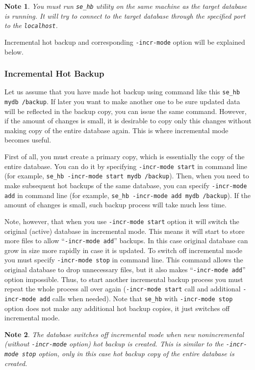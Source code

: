 \documentclass[a4paper,12pt]{article}
\newtheorem{note}{Note}    %
\begin{document}
\begin{note}
You must run \verb!se_hb! utility on the same machine as the target database is
running. It will try to connect to the target database through the specified
port to the \verb!localhost!.
\end{note}

Incremental hot backup and corresponding \verb!-incr-mode! option will be
explained below.


\subsubsection*{Incremental Hot Backup}

Let us assume that you have made hot backup using command like this
\verb!se_hb mydb /backup!. If later you want to make another one to be sure
updated data will be reflected in the backup copy, you can issue the same
command. However, if the amount of changes is small, it is desirable to copy
only this changes without making copy of the entire database again. This is
where incremental mode becomes useful.

First of all, you must create a primary copy, which is essentially the copy of
the entire database. You can do it by specifying \verb!-incr-mode start! in
command line (for example, \verb!se_hb -incr-mode start mydb /backup!). Then,
when you need to make subsequent hot backups of the same database, you can
specify \verb!-incr-mode add! in command line (for example,
\verb!se_hb -incr-mode add mydb /backup!). If the amount of changes is small,
such backup process will take much less time.

Note, however, that when you use \verb!-incr-mode start! option it will switch
the original (active) database in incremental mode. This means it will start to
store more files to allow ``\verb!-incr-mode add!'' backups. In this case
original database can grow in size more rapidly in case it is updated. To switch
off incremental mode you must specify \verb!-incr-mode stop! in command line.
This command allows the original database to drop unnecessary files, but it also
makes ``\verb!-incr-mode add!'' option impossible. Thus, to start another
incremental backup process you must repeat the whole process all over again
(\verb!-incr-mode start! call and additional \verb!-incr-mode add! calls when
needed). Note that \verb!se_hb! with \verb!-incr-mode stop! option does not make
any additional hot backup copies, it just switches off incremental mode.

\begin{note}
The database switches off incremental mode when new nonincremental (without
\verb!-incr-mode! option) hot backup is created. This is similar to the
\verb!-incr-mode stop! option, only in this case hot backup copy of the entire
database is created.
\end{note}
\end{document}
